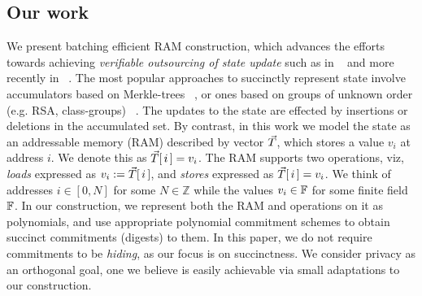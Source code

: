 \documentclass[sigconf]{acmart}
\begin{document}
\subsection{Our work}\label{subsec:ourwork}
We present batching efficient RAM construction, which advances the efforts
towards achieving {\em verifiable outsourcing of state update} such as in ~\cite{EPRINT:BFRSBW13}
and more recently in ~\cite{USENIX:OWWB20, CCS:CFHKKO22}.
The most popular approaches to succinctly represent
state involve accumulators based on Merkle-trees ~\cite{C:Merkle87}, or ones based on groups of unknown order
(e.g. RSA, class-groups) ~\cite{C:CamLys02,C:BonBunFis19,USENIX:OWWB20, CCS:CFHKKO22}.
The updates to the state are effected by insertions or deletions in the  accumulated set.
By contrast, in this work we
model the state as an addressable memory (RAM) described by vector $\vec{T}$, which stores a value $v_i$ at address $i$.
We denote this as $\vec{T}[\,i\,]=v_i$. The RAM supports two operations, viz, {\em loads} expressed
as $v_i := \vec{T}[\,i\,]$, and {\em stores} expressed as $\vec{T}[\,i\,]=v_i$.
We think of addresses $i\in [0,N]$ for some $N\in \mathbb{Z}$ while the
values $v_i\in \mathbb{F}$ for some finite field $\mathbb{F}$. In our construction, we represent both the RAM and operations on it
as polynomials, and use appropriate polynomial commitment schemes to obtain succinct commitments (digests) to them.
In this paper, we do not require commitments to be {\em hiding}, as our focus is on succinctness.
We consider privacy as an orthogonal goal, one we believe is easily achievable
via small adaptations to our construction.\smallskip
\end{document}
